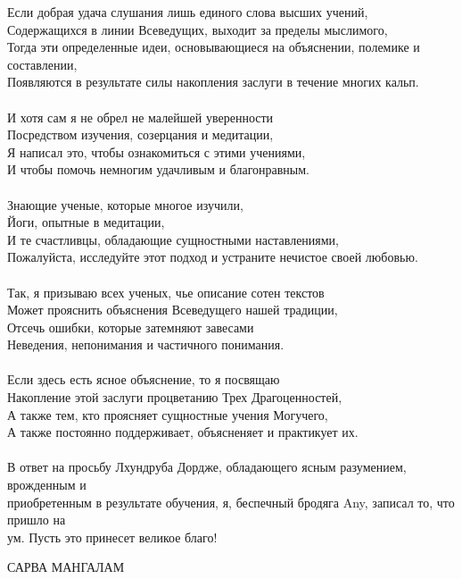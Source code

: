\begin{siderules}
Если добрая удача слушания лишь единого слова высших учений,\\
Содержащихся в линии Всеведущих, выходит за пределы мыслимого,\\
Тогда эти определенные идеи, основывающиеся на объяснении, полемике и составлении,\\
Появляются в результате силы накопления заслуги в течение многих кальп.\\
\\
И хотя сам я не обрел не малейшей уверенности\\
Посредством изучения, созерцания и медитации,\\
Я написал это, чтобы ознакомиться с этими учениями,\\
И чтобы помочь немногим удачливым и благонравным.\\
\\
Знающие ученые, которые многое изучили,\\
Йоги, опытные в медитации,\\
И те счастливцы, обладающие сущностными наставлениями,\\
Пожалуйста, исследуйте этот подход и устраните нечистое своей любовью.\\
\\
Так, я призываю всех ученых, чье описание сотен текстов\\
Может прояснить объяснения Всеведущего нашей традиции,\\
Отсечь ошибки, которые затемняют завесами\\
Неведения, непонимания и частичного понимания.\\
\\
Если здесь есть ясное объяснение, то я посвящаю\\
Накопление этой заслуги процветанию Трех Драгоценностей,\\
А также тем, кто проясняет сущностные учения Могучего,\\
А также постоянно поддерживает, объясненяет и практикует их.\\
\\
В ответ на просьбу Лхундруба Дордже, обладающего ясным разумением, врожденным и\\
приобретенным в результате обучения, я, беспечный бродяга Any, записал то, что пришло на\\
ум. Пусть это принесет великое благо!\\
\end{siderules}

САРВА МАНГАЛАМ

